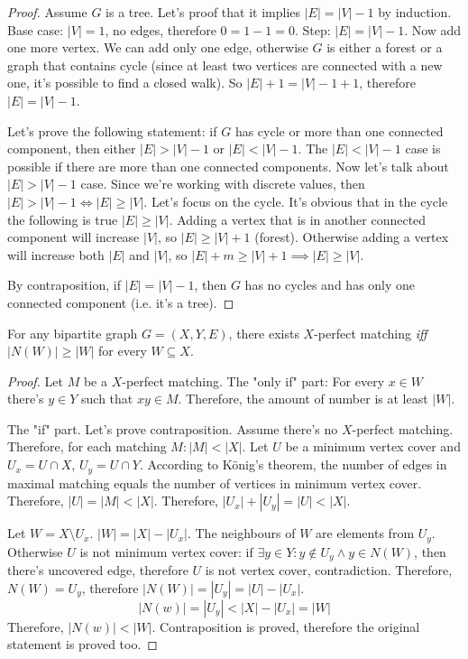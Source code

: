 \documentclass[12pt, a4paper]{article}
\begin{document}
\begin{proof}
Assume \(G\) is a tree. Let's proof that it implies \(|E| = |V| - 1\) by
induction. Base case: \(|V| = 1\), no edges, therefore \(0 = 1 - 1 = 0\). Step:
\(|E| = |V| - 1\). Now add one more vertex. We can add only one edge, otherwise
\(G\) is either a forest or a graph that contains cycle (since at least two
vertices are connected with a new one, it's possible to find a closed walk). So
\(|E| + 1 = |V| - 1 + 1\), therefore \(|E| = |V| - 1\).

Let's prove the following statement: if \(G\) has cycle or more than one
  connected component, then either \(|E| > |V| - 1\) or \(|E| < |V| - 1\).
The \(|E| < |V| - 1\) case is possible if there are more than one connected components.
Now let's talk about \(|E| > |V| - 1\) case. Since we're working with discrete values, then \(|E| > |V| - 1 \iff |E| \ge |V|\).
Let's focus on the cycle. It's obvious that in the cycle the following is true \(|E| \ge |V|\).
Adding a vertex that is in another connected component will increase \(|V|\), so \(|E| \ge |V| + 1\) (forest).
Otherwise adding a vertex will increase both \(|E|\) and \(|V|\), so \(|E| + m \ge |V| + 1 \implies |E| \ge |V|\).

By contraposition, if \(|E| = |V| - 1\), then \(G\) has no cycles and has only one connected component (i.e. it's a tree).
\end{proof}

\begin{theorem}[Hall]
For any bipartite graph \(G = (X, Y, E)\), there exists \(X\)-perfect matching
\textit{iff} \(|N(W)| \ge |W|\) for every \(W \subseteq X\).
\end{theorem}

\begin{proof}
Let \(M\) be a \(X\)-perfect matching.
The "only if" part: For every \(x \in W\) there's \(y \in Y\) such that \(xy \in M\).
Therefore, the amount of number is at least \(|W|\).

The "if" part. Let's prove contraposition.
Assume there's no \(X\)-perfect matching.
Therefore, for each matching \(M : |M| < |X|\).
Let \(U\) be a minimum vertex cover and \(U_x = U \cap X\), \(U_y = U \cap Y\).
According to K\"onig's theorem, the number of edges in maximal matching equals
the number of vertices in minimum vertex cover.
Therefore, \(|U| = |M| < |X|\). Therefore, \(|U_x| + |U_y| = |U| < |X|\).

Let \(W = X \setminus U_x\). \(|W| = |X| - |U_x|\).
The neighbours of \(W\) are elements from \(U_y\).
Otherwise \(U\) is not minimum vertex cover:
if \(\exists y \in Y : y \not\in U_y \land y \in N(W)\),
then there's uncovered edge, therefore \(U\) is not vertex cover, contradiction.
Therefore, \(N(W) = U_y\), therefore \(|N(W)| = |U_y| = |U| - |U_x|\).
\[|N(w)| = |U_y| < |X| - |U_x| = |W|\]
Therefore, \(|N(w)| < |W|\). Contraposition is proved, therefore
the original statement is proved too.
\end{proof}
\end{document}
